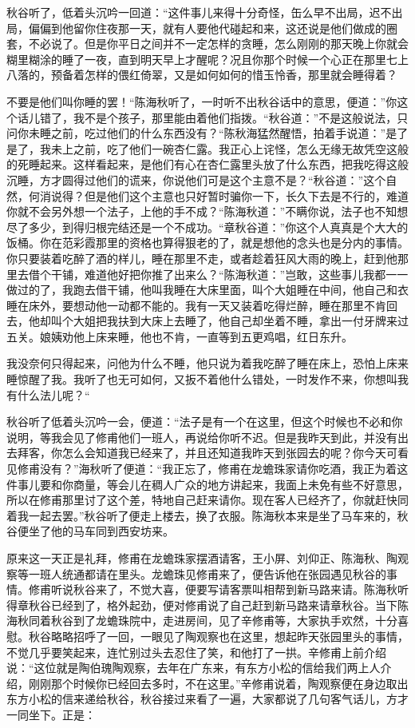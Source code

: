 \documentclass[12pt,UTF8]{ctexbook}
\begin{document}
{{{秋谷听了，低着头沉吟一回道：“这件事儿来得十分奇怪，缶么早不出局，迟不出局，偏偏到他留你住夜那一天，就有人要他代碰起和来，这还说是他们做成的圈套，不必说了。但是你平日之间并不一定怎样的贪睡，怎么刚刚的那天晚上你就会糊里糊涂的睡了一夜，直到明天早上才醒呢？况且你那个时候一个心正在那里七上八落的，预备着怎样的偎红倚翠，又是如何如何的惜玉怜香，那里就会睡得着？

不要是他们叫你睡的罢！“陈海秋听了，一时听不出秋谷话中的意思，便道：”你这个话儿错了，我不是个孩子，那里能由着他们指拨。“秋谷道：”不是这般说法，只问你未睡之前，吃过他们的什么东西没有？“陈秋海猛然醒悟，拍着手说道：”是了是了，我未上之前，吃了他们一碗杏仁露。我正心上诧怪，怎么无缘无故凭空这般的死睡起来。这样看起来，是他们有心在杏仁露里头放了什么东西，把我吃得这般沉睡，方才圆得过他们的谎来，你说他们可是这个主意不是？“秋谷道：”这个自然，何消说得？但是他们这个主意也只好暂时骗你一下，长久下去是不行的，难道你就不会另外想一个法子，上他的手不成？“陈海秋道：”不瞒你说，法子也不知想尽了多少，到得归根完结还是一个不成功。“章秋谷道：”你这个人真真是个大大的饭桶。你在范彩霞那里的资格也算得狠老的了，就是想他的念头也是分内的事情。你只要装着吃醉了酒的样儿，睡在那里不走，或者趁着狂风大雨的晚上，赶到他那里去借个干铺，难道他好把你推了出来么？“陈海秋道：”岂敢，这些事儿我都一一做过的了，我跑去借干铺，他叫我睡在大床里面，叫个大姐睡在中间，他自己和衣睡在床外，要想动他一动都不能的。我有一天又装着吃得烂醉，睡在那里不肯回去，他却叫个大姐把我扶到大床上去睡了，他自己却坐着不睡，拿出一付牙牌来过五关。娘姨劝他上床来睡，他也不肯，一直等到五更鸡唱，红日东升。

我没奈何只得起来，问他为什么不睡，他只说为着我吃醉了睡在床上，恐怕上床来睡惊醒了我。我听了也无可如何，又扳不着他什么错处，一时发作不来，你想叫我有什么法儿呢？“

秋谷听了低着头沉吟一会，便道：“法子是有一个在这里，但这个时候也不必和你说明，等我会见了修甫他们一班人，再说给你听不迟。但是我昨天到此，并没有出去拜客，你怎么会知道我已经来了，并且还知道我昨天到张园去的呢？你今天可看见修甫没有？”海秋听了便道：“我正忘了，修甫在龙蟾珠家请你吃酒，我正为着这件事儿要和你商量，等会儿在稠人广众的地方讲起来，我面上未免有些不好意思，所以在修甫那里讨了这个差，特地自己赶来请你。现在客人已经齐了，你就赶快同着我一起去罢。”秋谷听了便走上楼去，换了衣服。陈海秋本来是坐了马车来的，秋谷便坐了他的马车同到西安坊来。

原来这一天正是礼拜，修甫在龙蟾珠家摆酒请客，王小屏、刘仰正、陈海秋、陶观察等一班人统通都请在里头。龙蟾珠见修甫来了，便告诉他在张园遇见秋谷的事情。修甫听说秋谷来了，不觉大喜，便要写请客票叫相帮到新马路来请。陈海秋听得章秋谷已经到了，格外起劲，便对修甫说了自己赶到新马路来请章秋谷。当下陈海秋同着秋谷到了龙蟾珠院中，走进房间，见了辛修甫等，大家执手欢然，十分喜慰。秋谷略略招呼了一回，一眼见了陶观察也在这里，想起昨天张园里头的事情，不觉几乎要笑起来，连忙别过头去忍住了笑，和他打了一拱。辛修甫上前介绍说：“这位就是陶伯瑰陶观察，去年在广东来，有东方小松的信给我们两上人介绍，刚刚那个时候你已经回去多时，不在这里。”辛修甫说着，陶观察便在身边取出东方小松的信来递给秋谷，秋谷接过来看了一遍，大家都说了几句客气话儿，方才一同坐下。正是：

}}}
\end{document}
